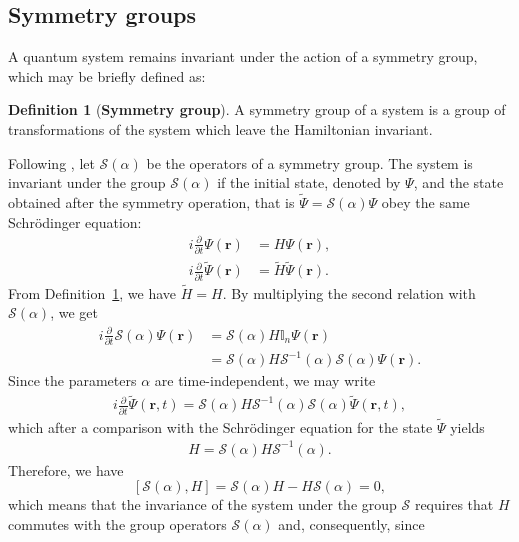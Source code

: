 \documentclass[12pt,a4paper]{report}
\theoremstyle{definition}
\newtheorem{definition}{Definition}
\theoremstyle{remark}
\theoremstyle{remark}
\begin{document}
\subsection{Symmetry groups}
A quantum system remains invariant under the action of a symmetry group, which may be briefly defined as:
\begin{definition}[\textbf{Symmetry group}]\label{dsym}
A symmetry group of a system is a group of transformations of the system which leave the Hamiltonian invariant.
\end{definition}
Following \cite{greiner}, let $\mathcal{S}(\alpha)$ be the operators of a symmetry group. The system is invariant under the group $\mathcal{S}(\alpha)$ if the initial state, denoted by $\Psi$, and the state obtained after the symmetry operation, that is $\widetilde{\Psi}=\mathcal{S}(\alpha)\Psi$ obey the same Schrödinger equation:
\begin{align*}
i\frac{\partial}{\partial t}\Psi(\textbf{r})&=H\Psi(\textbf{r}),\\
i\frac{\partial}{\partial t}\widetilde{\Psi}(\textbf{r})&=\widetilde{H}\widetilde{\Psi}(\textbf{r}).
\end{align*}
From Definition~\ref{dsym}, we have $\widetilde{H}=H$. By multiplying the second relation with $\mathcal{S}(\alpha)$, we get
\begin{align*}
i\frac{\partial}{\partial t}\mathcal{S}(\alpha)\Psi(\textbf{r})&=\mathcal{S}(\alpha)H\mathbb{I}_n\Psi(\textbf{r})\\
&=\mathcal{S}(\alpha)H\mathcal{S}^{-1}(\alpha)\mathcal{S}(\alpha)\Psi(\textbf{r}).
\end{align*}
Since the parameters $\alpha$ are time-independent, we may write
\begin{align*}
i\frac{\partial}{\partial t}\widetilde{\Psi}(\textbf{r},t)=\mathcal{S}(\alpha)H\mathcal{S}^{-1}(\alpha)\mathcal{S}(\alpha)\widetilde{\Psi}(\textbf{r},t),
\end{align*}
which after a comparison with the Schrödinger equation for the state $\widetilde{\Psi}$ yields
\begin{align*}
H=\mathcal{S}(\alpha)H\mathcal{S}^{-1}(\alpha).
\end{align*}
Therefore, we have
\begin{equation}\label{einv}
[\mathcal{S}(\alpha),H]=\mathcal{S}(\alpha)H-H\mathcal{S}(\alpha)=0,
\end{equation}
which means that the invariance of the system under the group $\mathcal{S}$ requires that $H$ commutes with the group operators $\mathcal{S}(\alpha)$ and, consequently, since
\end{document}
